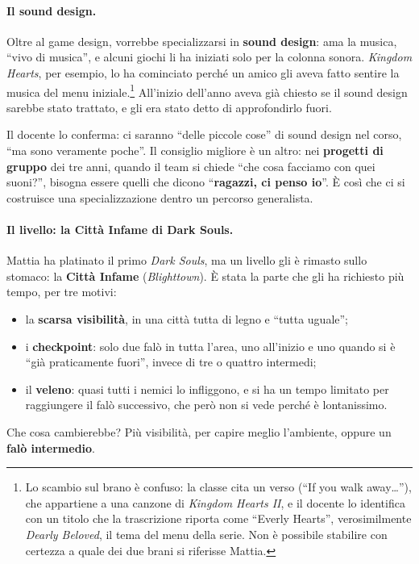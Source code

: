 \paragraph{Il sound design.} Oltre al game design, vorrebbe specializzarsi in
\textbf{sound design}: ama la musica, ``vivo di musica'', e alcuni giochi li
ha iniziati solo per la colonna sonora. \emph{Kingdom Hearts}, per esempio,
lo ha cominciato perché un amico gli aveva fatto sentire la musica del menu
iniziale.\footnote{Lo scambio sul brano è confuso: la classe cita un verso
(``If you walk away\dots''), che appartiene a una canzone di \emph{Kingdom
Hearts II}, e il docente lo identifica con un titolo che la trascrizione
riporta come ``Everly Hearts'', verosimilmente \emph{Dearly Beloved}, il tema
del menu della serie. Non è possibile stabilire con certezza a quale dei due
brani si riferisse Mattia.} All'inizio dell'anno aveva già chiesto se il sound
design sarebbe stato trattato, e gli era stato detto di approfondirlo fuori.

Il docente lo conferma: ci saranno ``delle piccole cose'' di sound design nel
corso, ``ma sono veramente poche''. Il consiglio migliore è un altro: nei
\textbf{progetti di gruppo} dei tre anni, quando il team si chiede ``che cosa
facciamo con quei suoni?'', bisogna essere quelli che dicono ``\textbf{ragazzi,
ci penso io}''. È così che ci si costruisce una specializzazione dentro un
percorso generalista.

\paragraph{Il livello: la Città Infame di Dark Souls.} Mattia ha platinato il
primo \emph{Dark Souls}, ma un livello gli è rimasto sullo stomaco: la
\textbf{Città Infame} (\emph{Blighttown}). È stata la parte che gli ha
richiesto più tempo, per tre motivi:
\begin{itemize}
  \item la \textbf{scarsa visibilità}, in una città tutta di legno e ``tutta
        uguale'';
  \item i \textbf{checkpoint}: solo due falò in tutta l'area, uno
        all'inizio e uno quando si è ``già praticamente fuori'', invece di
        tre o quattro intermedi;
  \item il \textbf{veleno}: quasi tutti i nemici lo infliggono, e si ha un
        tempo limitato per raggiungere il falò successivo, che però non si
        vede perché è lontanissimo.
\end{itemize}
Che cosa cambierebbe? Più visibilità, per capire meglio l'ambiente, oppure un
\textbf{falò intermedio}.


